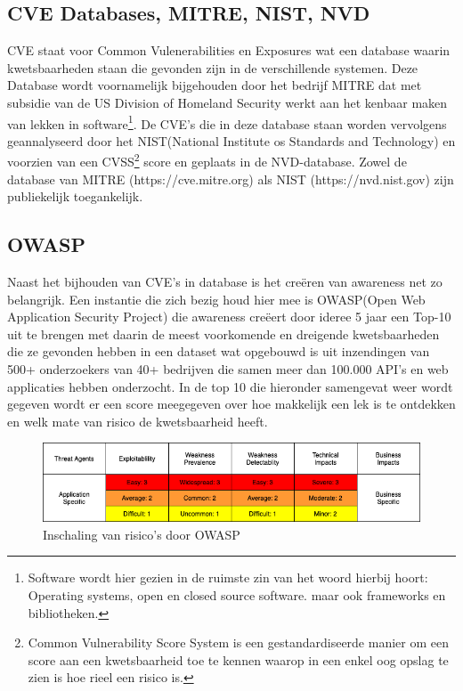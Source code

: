 \subsection{CVE Databases, MITRE, NIST, NVD}\label{subsec:mitre-nist-nvd}
CVE staat voor Common Vulenerabilities en Exposures wat een database waarin kwetsbaarheden staan die gevonden zijn in de verschillende systemen.
Deze Database wordt voornamelijk bijgehouden door het bedrijf MITRE dat met subsidie van de US Division of Homeland Security werkt aan het kenbaar maken van lekken in software\footnote{Software wordt hier gezien in de ruimste zin van het woord hierbij hoort: Operating systems, open en closed source software. maar ook frameworks en bibliotheken.}.
De CVE's die in deze database staan worden vervolgens geannalyseerd door het NIST(National Institute os Standards and Technology) en voorzien van een CVSS\footnote{Common Vulnerability Score System is een gestandardiseerde manier om een score aan een kwetsbaarheid toe te kennen waarop in een enkel oog opslag te zien is hoe rieel een risico is.} score en geplaats in de NVD-database.
Zowel de database van MITRE (https://cve.mitre.org) als NIST (https://nvd.nist.gov) zijn publiekelijk toegankelijk.

\subsection{OWASP}\label{subsec:owasp}
Naast het bijhouden van CVE's in database is het creëren van awareness net zo belangrijk.
Een instantie die zich bezig houd hier mee is OWASP(Open Web Application Security Project) die awareness creëert door ideree 5 jaar een Top-10 uit te brengen met daarin de meest voorkomende en dreigende kwetsbaarheden die ze gevonden hebben in een dataset wat opgebouwd is uit inzendingen van 500+ onderzoekers van 40+ bedrijven die samen meer dan 100.000 API's en web applicaties hebben onderzocht.
In de top 10 die hieronder samengevat weer wordt gegeven wordt er een score meegegeven over hoe makkelijk een lek is te ontdekken en welk mate van risico de kwetsbaarheid heeft.

\begin{figure}[H]
    \myfloatalign
    \includegraphics[width=12cm]{gfx/risk tabel}
    \caption{Inschaling van risico's door OWASP}
    \label{fig:risico inschaling}
\end{figure}


